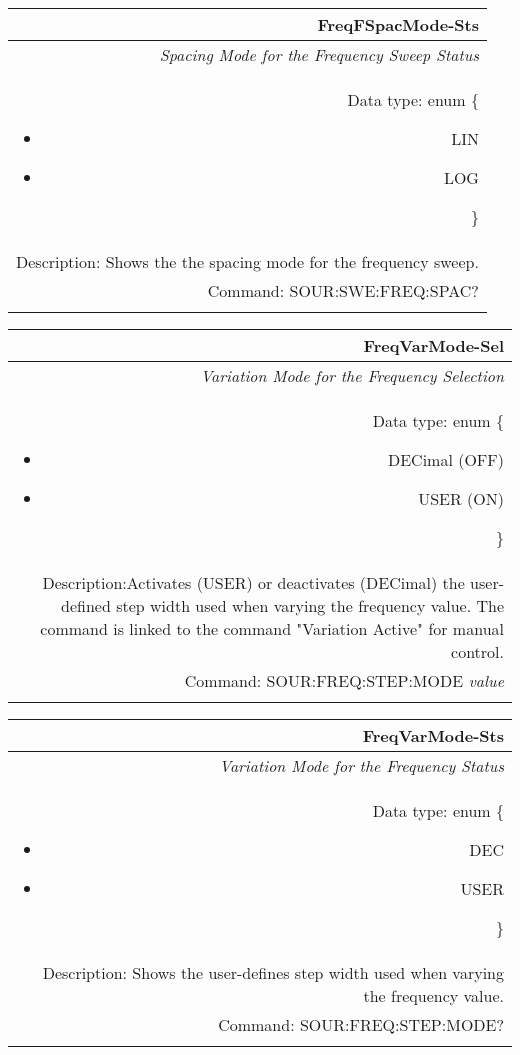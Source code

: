 \documentclass[openany]{article}
\begin{document}
		\begin{tabular}{N}
			\hline
			\bfseries FreqFSpacMode-Sts \\ \hline
			\emph{Spacing Mode for the Frequency Sweep Status} \\
			Data type: enum \{\begin{itemize}[noitemsep]
				\small
				\item[] LIN
				\item[] LOG
			\end{itemize}\} \\ 
			Description: Shows the the spacing mode for the frequency sweep. \\
			Command: SOUR:SWE:FREQ:SPAC? \\
			\\

		\end{tabular}


		\begin{tabular}{N}
			\hline
			\bfseries FreqVarMode-Sel \\ \hline
			\emph{Variation Mode for the Frequency Selection} \\
			Data type: enum \{\begin{itemize}[noitemsep]
				\small
				\item[] DECimal (OFF)
				\item[] USER (ON)
			\end{itemize}\} \\
			Description:Activates (USER) or deactivates (DECimal) the user-defined step width used when varying the frequency value. The command is linked to the command "Variation Active" for manual control. \\
			Command: SOUR:FREQ:STEP:MODE \emph{value} \\
			\\

		\end{tabular}


		\begin{tabular}{N}
			\hline
			\bfseries FreqVarMode-Sts \\ \hline
			\emph{Variation Mode for the Frequency Status} \\
			Data type: enum \{\begin{itemize}[noitemsep]
				\small
				\item[] DEC
				\item[] USER
			\end{itemize}\} \\ 
			Description: Shows the user-defines step width used when varying the frequency value. \\
			Command: SOUR:FREQ:STEP:MODE? \\
			\\

		\end{tabular}
\end{document}
